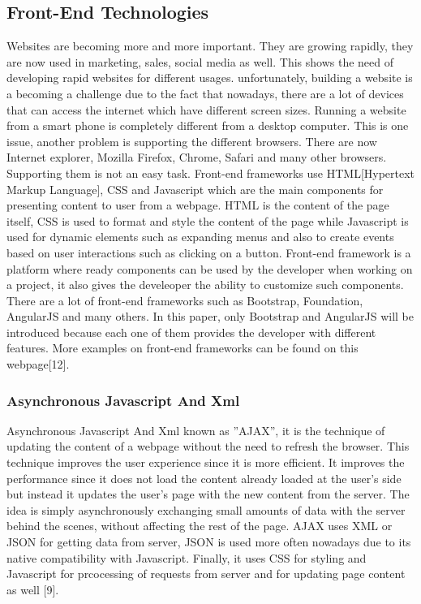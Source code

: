 \subsection{Front-End Technologies}
Websites are becoming more and more important. They are growing rapidly, they are now used in marketing, sales, social media as well. This shows the need of developing rapid websites for different usages. unfortunately, building a website is a becoming a challenge due to the fact that nowadays, there are a lot of devices that can access the internet which have different screen sizes. Running a website from a smart phone is completely different from a desktop computer. This is one issue, another problem is supporting the different browsers. There are now Internet explorer, Mozilla Firefox, Chrome, Safari and many other browsers. Supporting them is not an easy task.
Front-end frameworks use HTML[Hypertext Markup Language], CSS and Javascript which are the main components for presenting content to user from a webpage. HTML is the content of the page itself, CSS is used to format and style the content of the page while Javascript is used for dynamic elements such as expanding menus and also to create events based on user interactions such as clicking on a button. Front-end framework is a platform where ready components can be used by the developer when working on a project, it also gives the develeoper the ability to customize such components. There are a lot of front-end frameworks such as Bootstrap, Foundation, AngularJS and many others. In this paper, only Bootstrap and AngularJS will be introduced because each one of them provides the developer with different features. More examples on front-end frameworks can be found on this webpage[12].
\subsubsection{Asynchronous Javascript And Xml}
Asynchronous Javascript And Xml known as ”AJAX”, it is the technique of updating the content of a webpage without the need to refresh the browser. This technique improves the user experience since it is more efficient. It improves the performance since it does not load the content already loaded at the user’s side but instead it updates the user’s page with the new content from the server. The idea is simply asynchronously exchanging small amounts of data with the server behind the scenes, without affecting the rest of the page. AJAX uses XML or JSON for getting data from server, JSON is used more often nowadays due to its native compatibility with Javascript. Finally, it uses CSS for styling and Javascript for prcocessing of requests from server and for updating page content as well [9].
